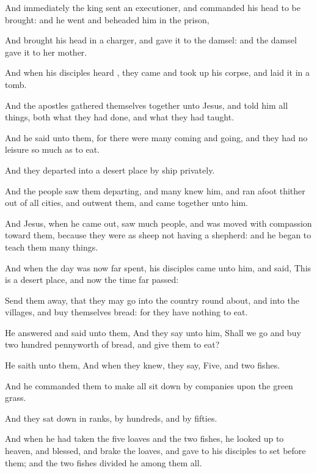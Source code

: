 {And
immediately the
king
sent an
executioner, and
commanded
his
head to be
brought:
and he
went and
beheaded
him
in the
prison,

And
brought
his
head
in a
charger,
and
gave
it to the
damsel:
and the
damsel
gave
it to
her
mother.

And when
his
disciples
heard
{}, they
came
and took
up
his
corpse,
and
laid
it
in a
tomb.

And the
apostles gathered themselves
together
unto
Jesus,
and
told
him all
things,
both
what they had
done,
and
what they had
taught.

And he
said unto
them,
{}
for there
were
many
coming
and
going,
and they
had
no
leisure so much as to
eat.

And they
departed
into a
desert
place by
ship
privately.

And the
people
saw
them
departing,
and
many
knew
him,
and
ran
afoot
thither
out of
all
cities,
and
outwent
them,
and came
together
unto
him.

And
Jesus, when he came
out,
saw
much
people,
and was moved with
compassion
toward
them,
because they
were
as
sheep
not
having a
shepherd:
and he
began to
teach
them many
things.

And when the
day
was
now far
spent,
his
disciples
came unto
him, and
said, This
is a
desert
place,
and
now the
time
{} far
passed:

Send
them
away,
that they may
go
into the
country round
about,
and into the
villages, and
buy
themselves
bread:
for they
have
nothing to
eat.

He
answered and
said unto
them,
{}
And they
say unto
him, Shall we
go and
buy two
hundred
pennyworth of
bread,
and
give
them to
eat?

He
saith unto
them,
{}
And when they
knew, they
say,
Five,
and
two
fishes.

And he
commanded
them to
make
all sit
down by
companies
upon the
green
grass.

And they sat
down in
ranks,
by
hundreds,
and
by
fifties.

And when he had
taken the
five
loaves
and the
two
fishes, he
looked up
to
heaven,
and
blessed, and
brake the
loaves,
and
gave
{} to
his
disciples
to set
before
them;
and the
two
fishes divided he
among them
all.

}
